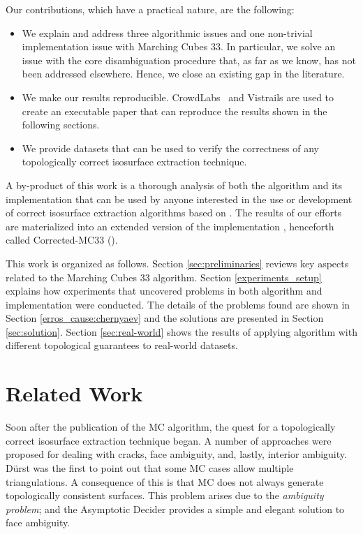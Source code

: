 Our contributions, which have a practical nature, are the following:
\begin{itemize}
\item We explain and address three algorithmic issues and one non-trivial implementation issue with Marching Cubes 33. In particular, we solve an issue with the core \mc{} disambiguation procedure that, as far as we know, has not been addressed elsewhere. Hence, we close an existing gap in the \mc{} literature.
\item We make our results reproducible. CrowdLabs~\cite{Tohline:2010jn} and Vistrails \cite{Freire:2006va} are used to create an executable paper that can reproduce the results shown in the following sections.
\item We provide datasets that  can be used to verify the correctness of any topologically correct isosurface extraction technique.
\end{itemize}
A by-product of this work is a thorough analysis of both the \mc{} algorithm and its implementation that can be used by anyone interested in  the use or development of correct isosurface extraction algorithms based on \mc{}. The results of our efforts are materialized into an extended version of the \mc{} implementation \cite{lewiner:impl}, henceforth called Corrected-MC33 (\cmc).

This work is organized as follows. Section \ref{sec:preliminaries} reviews key aspects related to the Marching Cubes 33 algorithm. Section \ref{experiments_setup} explains how experiments that uncovered problems in both \mc{} algorithm and implementation were conducted. The details of the problems found are shown in Section \ref{erros_cause:chernyaev} and the solutions are presented in Section \ref{sec:solution}. Section \ref{sec:real-world} shows the results of applying algorithm with different topological guarantees to real-world datasets.




\section{Related Work}
\label{related_work1}

Soon after the publication of the MC algorithm, the quest for a topologically correct isosurface extraction technique began. A number of approaches were proposed for dealing with cracks, face ambiguity, and, lastly, interior ambiguity.
%
D\"urst \cite{Durst88} was the first to point out that some MC cases allow multiple triangulations. A consequence of this is that MC does not always generate topologically consistent surfaces. This problem arises due to the \emph{ambiguity problem}; and
the Asymptotic Decider \cite{Nielson:1991:ADR:949607.949621} provides a simple and elegant solution to face ambiguity.

